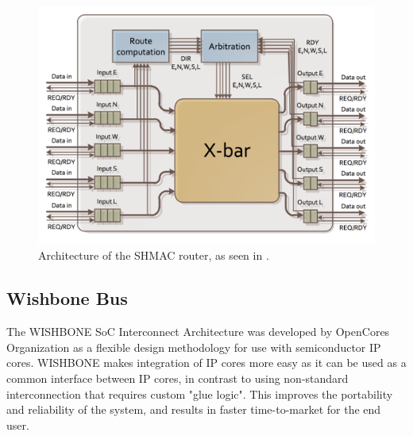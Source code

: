 \begin{figure}[htb]
    \centering
    \includegraphics[width=1.0\textwidth]{Figures/Heterogeneous/SHMACRouter}
    \caption{Architecture of the SHMAC router, as seen in \cite{shmac-plan}.}
    \label{fig:shmac-router}
\end{figure}




%



\subsection{Wishbone Bus}
The WISHBONE SoC Interconnect Architecture was developed by OpenCores Organization as a flexible design methodology for use with semiconductor IP cores.
WISHBONE makes integration of IP cores more easy as it can be used as a common interface between IP cores, in contrast to using non-standard interconnection that requires custom "glue logic". 
This improves the portability and reliability of the system, and results in faster time-to-market for the end user.


